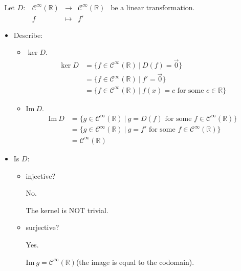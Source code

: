 \documentclass[11pt,fleqn]{book} %
\begin{document}
\begin{example}

    $\begin{matrix} \text{Let } D: &\mathcal{C}^\infty(\mathbb{R}) &\to &\mathcal{C}^\infty(\mathbb{R}) &\text{be a linear transformation.} \\ &f &\mapsto &f' \end{matrix}$

    \begin{itemize}
        \item Describe: 
        
        \begin{itemize}
            \item $\ker D$. 
            \begin{align*}
                \ker D 
                &= \{f\in \mathcal{C}^\infty(\mathbb{R}) ~|~D(f) = \vec{0} \}
                \\
                &= \{ f \in \mathcal{C}^\infty(\mathbb{R}) ~|~f'=\vec{0} \}
                \\
                &=\{ f \in \mathcal{C}^\infty(\mathbb{R}) ~|~ f(x) = c \text{ for some } c \in \mathbb{R}\}
            \end{align*}

            \item $\mathrm{Im}~D$. 
            \begin{align*}
                \mathrm{Im}~D
                &=\{ g \in \mathcal{C}^\infty(\mathbb{R}) ~|~g=D(f) \text{ for some }f \in \mathcal{C}^\infty(\mathbb{R}) \}
                \\  
                &=\{ g \in \mathcal{C}^\infty(\mathbb{R}) ~|~ g = f' \text{ for some } f \in \mathcal{C}^\infty(\mathbb{R}) \}
                \\
                &= \mathcal{C}^\infty(\mathbb{R})
            \end{align*}
        \end{itemize}
        
        \item Is $D$: 
        
        \begin{itemize}
            \item injective? 
            
            No. 
            
            The kernel is NOT trivial. 
            \item surjective?
            
            Yes. 
            
            $\mathrm{Im}~g=\mathcal{C}^\infty(\mathbb{R})$(the image is equal to the codomain). 
        \end{itemize}
    \end{itemize}
\end{example}
\end{document}

